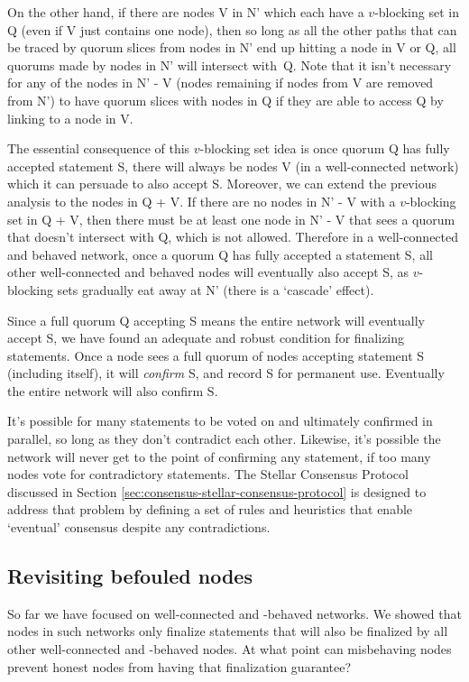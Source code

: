 On the other hand, if there are nodes V in N' which each have a $v$-blocking set in Q (even if V just contains one node), then so long as all the other paths that can be traced by quorum slices from nodes in N' end up hitting a node in V or Q, all quorums made by nodes in N' will intersect with~Q. Note that it isn't necessary for any of the nodes in N' - V (nodes remaining if nodes from V are removed from N') to have quorum slices with nodes in Q if they are able to access Q by linking to a node in V.

The essential consequence of this $v$-blocking set idea is once quorum Q has fully accepted statement S, there will always be nodes V (in a well-connected network) which it can persuade to also accept S. Moreover, we can extend the previous analysis to the nodes in Q + V. If there are no nodes in N' - V with a $v$-blocking set in Q + V, then there must be at least one node in N' - V that sees a quorum that doesn't intersect with Q, which is not allowed. Therefore in a well-connected and behaved network, once a quorum Q has fully accepted a statement S, all other well-connected and behaved nodes will eventually also accept S, as $v$-blocking sets gradually eat away at N' (there is a `cascade' effect).

Since a full quorum Q accepting S means the entire network will eventually accept S, we have found an adequate and robust condition for finalizing statements. Once a node sees a full quorum of nodes accepting statement S (including itself), it will {\em confirm} S, and record S for permanent use. Eventually the entire network will also confirm S.

It's possible for many statements to be voted on and ultimately confirmed in parallel, so long as they don't contradict each other. Likewise, it's possible the network will never get to the point of confirming any statement, if too many nodes vote for contradictory statements. The Stellar Consensus Protocol discussed in Section \ref{sec:consensus-stellar-consensus-protocol} is designed to address that problem by defining a set of rules and heuristics that enable `eventual' consensus despite any contradictions.


\subsection{Revisiting befouled nodes}
\label{subsec:consensus-revisiting-befouled-nodes}

So far we have focused on well-connected and -behaved networks. We showed that nodes in such networks only finalize statements that will also be finalized by all other well-connected and -behaved nodes. At what point can misbehaving nodes prevent honest nodes from having that finalization guarantee?

